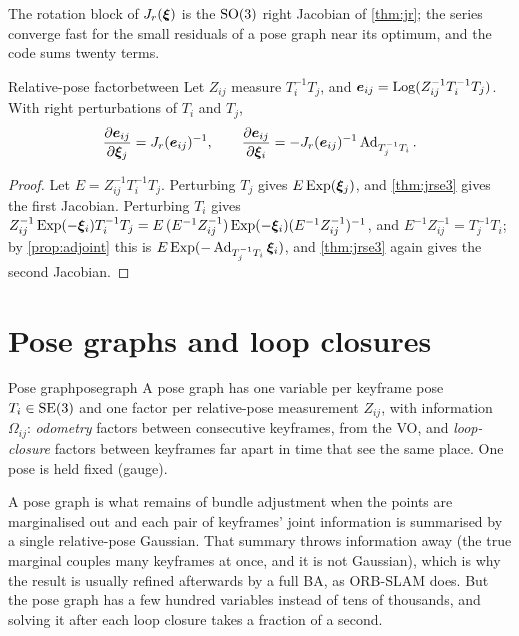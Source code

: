 The rotation block of $J_r(\bm{\xi})$ is the $\mathrm{SO}(3)$ right Jacobian of
\cref{thm:jr}; the series converge fast for the small residuals of a
pose graph near its optimum, and the code sums twenty terms.

\begin{proposition}{Relative-pose factor}{between}
Let $Z_{ij}$ measure $T_i^{-1}T_j$, and $\bm{e}_{ij}=\operatorname{Log}(Z_{ij}^{-1}
T_i^{-1}T_j)$. With right perturbations of $T_i$ and $T_j$,
\[
\frac{\partial\bm{e}_{ij}}{\partial\bm{\xi}_j}=J_r(\bm{e}_{ij})^{-1},
\qquad
\frac{\partial\bm{e}_{ij}}{\partial\bm{\xi}_i}=-J_r(\bm{e}_{ij})^{-1}
\operatorname{Ad}_{T_j^{-1}T_i}.
\]
\end{proposition}

\begin{proof}
Let $E=Z_{ij}^{-1}T_i^{-1}T_j$. Perturbing $T_j$ gives $E\operatorname{Exp}(\bm{\xi}_j)$,
and \cref{thm:jrse3} gives the first Jacobian. Perturbing $T_i$ gives
$Z_{ij}^{-1}\operatorname{Exp}(-\bm{\xi}_i)T_i^{-1}T_j=E\,(E^{-1}Z_{ij}^{-1})\operatorname{Exp}(-\bm{\xi}_i)
(E^{-1}Z_{ij}^{-1})^{-1}$, and $E^{-1}Z_{ij}^{-1}=T_j^{-1}T_i$; by
\cref{prop:adjoint} this is $E\operatorname{Exp}(-\operatorname{Ad}_{T_j^{-1}T_i}\bm{\xi}_i)$, and
\cref{thm:jrse3} again gives the second Jacobian.
\end{proof}

\section{Pose graphs and loop closures}

\begin{definition}{Pose graph}{posegraph}
A pose graph has one variable per keyframe pose $T_i\in\mathrm{SE}(3)$ and one
factor per relative-pose measurement $Z_{ij}$, with information
$\Omega_{ij}$: \emph{odometry} factors between consecutive keyframes,
from the VO, and \emph{loop-closure} factors between keyframes far apart
in time that see the same place. One pose is held fixed (gauge).
\end{definition}

A pose graph is what remains of bundle adjustment when the points are
marginalised out and each pair of keyframes' joint information is
summarised by a single relative-pose Gaussian. That summary throws
information away (the true marginal couples many keyframes at once, and
it is not Gaussian), which is why the result is usually refined
afterwards by a full BA, as ORB-SLAM does. But the pose graph has a few
hundred variables instead of tens of thousands, and solving it after
each loop closure takes a fraction of a second.

